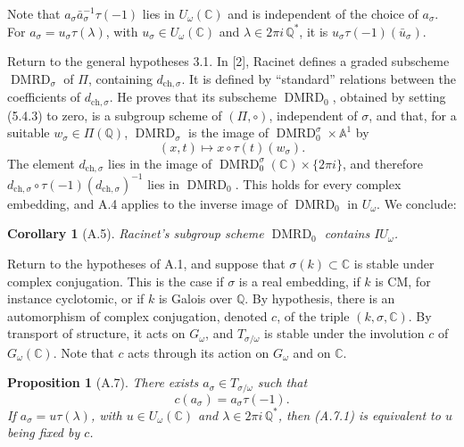\documentclass[10pt,a4paper]{article}
\newcommand{\Q}{\mathbb Q}
\newcommand{\A}{\mathbb A}
\newcommand{\C}{\mathbb C}
\newcommand{\DMRD}{\operatorname{DMRD}}
\theoremstyle{deligne}
\newtheorem*{proposition*}{Proposition}
\newtheorem*{corollary*}{Corollary}
\newcommand{\heading}[1]{\vspace{0.65em}\noindent{\bfseries #1}\quad}
\begin{document}
Note that \(a_\sigma\bar a_\sigma^{-1}\tau(-1)\) lies in \(U_\omega(\C)\) and is independent of the choice of \(a_\sigma\). For \(a_\sigma=u_\sigma\tau(\lambda)\), with \(u_\sigma\in U_\omega(\C)\) and \(\lambda\in2\pi i\,\Q^*\), it is \(u_\sigma\tau(-1)(\bar u_\sigma)\).

\heading{A.5.} Return to the general hypotheses 3.1. In [2], Racinet defines a graded subscheme \(\DMRD_\sigma\) of \(\Pi\), containing \(d_{\mathrm{ch},\sigma}\). It is defined by ``standard'' relations between the coefficients of \(d_{\mathrm{ch},\sigma}\). He proves that its subscheme \(\DMRD_0\), obtained by setting (5.4.3) to zero, is a subgroup scheme of \((\Pi,\circ)\), independent of \(\sigma\), and that, for a suitable \(w_\sigma\in\Pi(\Q)\), \(\DMRD_\sigma\) is the image of \(\DMRD_0^\sigma\times\A^1\) by
\[
(x,t)\longmapsto x\circ\tau(t)(w_\sigma).
\]
The element \(d_{\mathrm{ch},\sigma}\) lies in the image of \(\DMRD_0^\sigma(\C)\times\{2\pi i\}\), and therefore \(d_{\mathrm{ch},\sigma}\circ\tau(-1)(d_{\mathrm{ch},\sigma})^{-1}\) lies in \(\DMRD_0\). This holds for every complex embedding, and A.4 applies to the inverse image of \(\DMRD_0\) in \(U_\omega\). We conclude:

\begin{corollary*}[A.5]
Racinet's subgroup scheme \(\DMRD_0\) contains \(IU_\omega\).
\end{corollary*}

\heading{A.6.} Return to the hypotheses of A.1, and suppose that \(\sigma(k)\subset\C\) is stable under complex conjugation. This is the case if \(\sigma\) is a real embedding, if \(k\) is CM, for instance cyclotomic, or if \(k\) is Galois over \(\Q\). By hypothesis, there is an automorphism of complex conjugation, denoted \(c\), of the triple \((k,\sigma,\C)\). By transport of structure, it acts on \(G_\omega\), and \(T_{\sigma/\omega}\) is stable under the involution \(c\) of \(G_\omega(\C)\). Note that \(c\) acts through its action on \(G_\omega\) and on \(\C\).

\begin{proposition*}[A.7]
There exists \(a_\sigma\in T_{\sigma/\omega}\) such that
\[
\tag{A.7.1}
c(a_\sigma)=a_\sigma\tau(-1).
\]
If \(a_\sigma=u\tau(\lambda)\), with \(u\in U_\omega(\C)\) and \(\lambda\in2\pi i\,\Q^*\), then (A.7.1) is equivalent to \(u\) being fixed by \(c\).
\end{proposition*}
\end{document}
